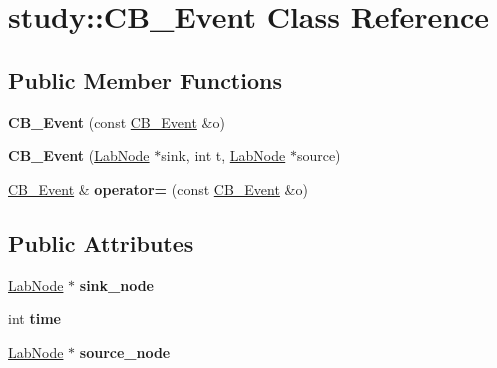 \hypertarget{classstudy_1_1_c_b___event}{\section{study\+:\+:C\+B\+\_\+\+Event Class Reference}
\label{classstudy_1_1_c_b___event}
}
\subsection*{Public Member Functions}
\begin{DoxyCompactItemize}
\item 
\hypertarget{classstudy_1_1_c_b___event_a372e9110c430cd48b40dfffba54a7d29}{{\bfseries C\+B\+\_\+\+Event} (const \hyperlink{classstudy_1_1_c_b___event}{C\+B\+\_\+\+Event} \&o)}\label{classstudy_1_1_c_b___event_a372e9110c430cd48b40dfffba54a7d29}

\item 
\hypertarget{classstudy_1_1_c_b___event_a7cbfe1b46734ffec56d97497a6e5b7b8}{{\bfseries C\+B\+\_\+\+Event} (\hyperlink{classelps_1_1_lab_node}{Lab\+Node} $\ast$sink, int t, \hyperlink{classelps_1_1_lab_node}{Lab\+Node} $\ast$source)}\label{classstudy_1_1_c_b___event_a7cbfe1b46734ffec56d97497a6e5b7b8}

\item 
\hypertarget{classstudy_1_1_c_b___event_a7244da82fc19b26240b847f03a75a195}{\hyperlink{classstudy_1_1_c_b___event}{C\+B\+\_\+\+Event} \& {\bfseries operator=} (const \hyperlink{classstudy_1_1_c_b___event}{C\+B\+\_\+\+Event} \&o)}\label{classstudy_1_1_c_b___event_a7244da82fc19b26240b847f03a75a195}

\end{DoxyCompactItemize}
\subsection*{Public Attributes}
\begin{DoxyCompactItemize}
\item 
\hypertarget{classstudy_1_1_c_b___event_af0488455270e52531748a4e36facb491}{\hyperlink{classelps_1_1_lab_node}{Lab\+Node} $\ast$ {\bfseries sink\+\_\+node}}\label{classstudy_1_1_c_b___event_af0488455270e52531748a4e36facb491}

\item 
\hypertarget{classstudy_1_1_c_b___event_a71c448cf17afd39c547a613401c8ccc9}{int {\bfseries time}}\label{classstudy_1_1_c_b___event_a71c448cf17afd39c547a613401c8ccc9}

\item 
\hypertarget{classstudy_1_1_c_b___event_ab7c968bddb8260c7a58b64550cad0d69}{\hyperlink{classelps_1_1_lab_node}{Lab\+Node} $\ast$ {\bfseries source\+\_\+node}}\label{classstudy_1_1_c_b___event_ab7c968bddb8260c7a58b64550cad0d69}

\end{DoxyCompactItemize}

